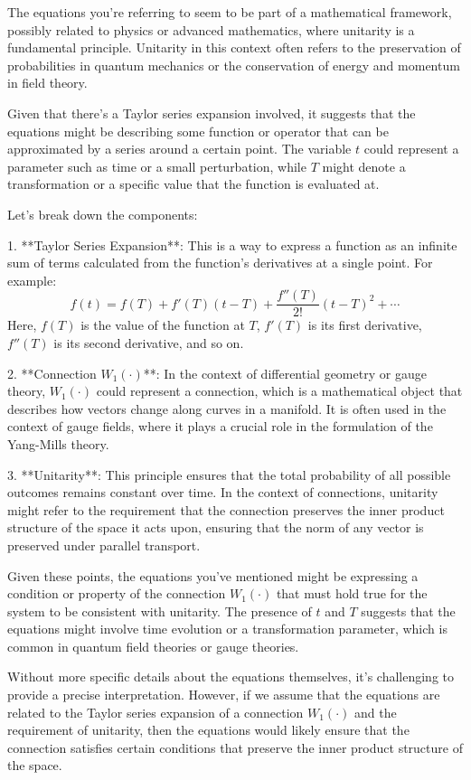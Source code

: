 The equations you're referring to seem to be part of a mathematical framework, possibly related to physics or advanced mathematics, where unitarity is a fundamental principle. Unitarity in this context often refers to the preservation of probabilities in quantum mechanics or the conservation of energy and momentum in field theory.

Given that there's a Taylor series expansion involved, it suggests that the equations might be describing some function or operator that can be approximated by a series around a certain point. The variable \( t \) could represent a parameter such as time or a small perturbation, while \( T \) might denote a transformation or a specific value that the function is evaluated at.

Let's break down the components:

1. **Taylor Series Expansion**: This is a way to express a function as an infinite sum of terms calculated from the function's derivatives at a single point. For example:
   \[
   f(t) = f(T) + f'(T)(t-T) + \frac{f''(T)}{2!}(t-T)^2 + \cdots
   \]
   Here, \( f(T) \) is the value of the function at \( T \), \( f'(T) \) is its first derivative, \( f''(T) \) is its second derivative, and so on.

2. **Connection \( W_1(\cdot) \)**: In the context of differential geometry or gauge theory, \( W_1(\cdot) \) could represent a connection, which is a mathematical object that describes how vectors change along curves in a manifold. It is often used in the context of gauge fields, where it plays a crucial role in the formulation of the Yang-Mills theory.

3. **Unitarity**: This principle ensures that the total probability of all possible outcomes remains constant over time. In the context of connections, unitarity might refer to the requirement that the connection preserves the inner product structure of the space it acts upon, ensuring that the norm of any vector is preserved under parallel transport.

Given these points, the equations you've mentioned might be expressing a condition or property of the connection \( W_1(\cdot) \) that must hold true for the system to be consistent with unitarity. The presence of \( t \) and \( T \) suggests that the equations might involve time evolution or a transformation parameter, which is common in quantum field theories or gauge theories.

Without more specific details about the equations themselves, it's challenging to provide a precise interpretation. However, if we assume that the equations are related to the Taylor series expansion of a connection \( W_1(\cdot) \) and the requirement of unitarity, then the equations would likely ensure that the connection satisfies certain conditions that preserve the inner product structure of the space.

